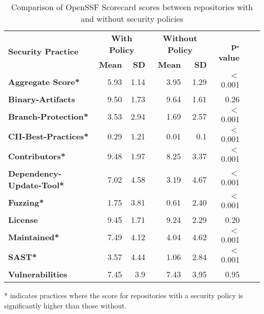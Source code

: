 \begin{table}[h!]
\centering
\caption{Comparison of OpenSSF Scorecard scores between repositories with and without security policies}
\label{tab:SSF_score_statistics}
\begin{tabular}{@{}lrrrrrrr@{}}
\toprule
\multirow{2}{*}{\textbf{Security Practice}} & \multicolumn{2}{c}{\textbf{With Policy}} & \multicolumn{2}{c}{\textbf{Without Policy}} & \multirow{2}{*}{\textbf{p-value}} \\ \cmidrule(lr){2-3} \cmidrule(lr){4-5}
 & \textbf{Mean} & \textbf{SD} & \textbf{Mean} & \textbf{SD} &  \\ \midrule
\textbf{Aggregate Score*} & 5.93 & 1.14 & 3.95 & 1.29 & $<$0.001 \\
\textbf{Binary-Artifacts} & 9.50 & 1.73 & 9.64 & 1.61 & 0.26 \\
\textbf{Branch-Protection*} & 3.53 & 2.94 & 1.69 & 2.57 & $<$0.001 \\
\textbf{CII-Best-Practices*} & 0.29  & 1.21 & 0.01 & 0.1 & $<$0.001 \\
\textbf{Contributors*} & 9.48 & 1.97 & 8.25 & 3.37 & $<$0.001 \\
\textbf{Dependency-Update-Tool*} & 7.02 & 4.58 & 3.19 & 4.67 & $<$0.001 \\
\textbf{Fuzzing*} & 1.75 & 3.81 & 0.61 & 2.40 & $<$0.001 \\
\textbf{License} & 9.45 & 1.71 & 9.24 & 2.29 & 0.20 \\
\textbf{Maintained*} & 7.49 & 4.12 & 4.04 & 4.62 & $<$0.001 \\
\textbf{SAST*} & 3.57 & 4.44 & 1.06 & 2.84 & $<$0.001 \\
\textbf{Vulnerabilities} & 7.45 & 3.9 & 7.43 & 3.95 & 0.95 \\ \bottomrule
\end{tabular}
\centering
\begin{tablenotes}
\item{* indicates practices where the score for repositories with a security policy is significantly higher than those without.}
\end{tablenotes}

\end{table}

